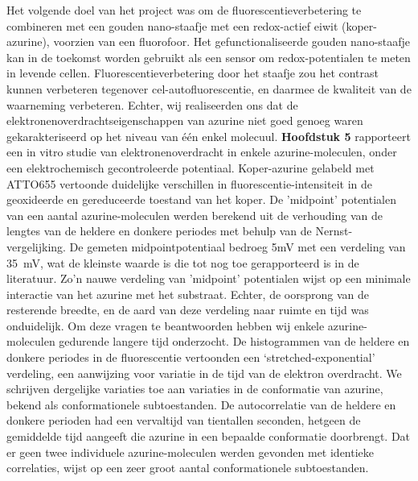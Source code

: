 Het volgende doel van het project was om de fluorescentieverbetering te combineren met een gouden nano-staafje met een redox-actief eiwit (koper-azurine), voorzien van een fluorofoor. Het gefunctionaliseerde gouden nano-staafje kan in de toekomst worden gebruikt als een sensor om redox-potentialen te meten in levende cellen. Fluorescentieverbetering door het staafje zou het contrast kunnen verbeteren tegenover cel-autofluorescentie, en daarmee de kwaliteit van de waarneming verbeteren. Echter, wij realiseerden ons dat de elektronenoverdrachtseigenschappen van azurine niet goed genoeg waren gekarakteriseerd op het niveau van één enkel molecuul. \textbf{Hoofdstuk 5} rapporteert een in vitro studie van elektronenoverdracht in enkele azurine-moleculen, onder een elektrochemisch gecontroleerde potentiaal. Koper-azurine gelabeld met ATTO655 vertoonde duidelijke verschillen in fluorescentie-intensiteit in de geoxideerde en gereduceerde toestand van het koper. De ’midpoint’ potentialen van een aantal azurine-moleculen werden berekend uit de verhouding van de lengtes van de heldere en donkere periodes met behulp van de Nernst-vergelijking. De gemeten midpointpotentiaal bedroeg 5mV met een verdeling  van \SI{35}{\mV}, wat de kleinste waarde is die tot nog toe  gerapporteerd is in de
literatuur. Zo'n nauwe verdeling van ’midpoint’ potentialen wijst op een minimale interactie van het azurine met het substraat. Echter, de oorsprong van de resterende breedte, en de aard van deze verdeling naar ruimte en tijd was onduidelijk. Om deze vragen te beantwoorden hebben wij enkele azurine-moleculen gedurende langere tijd onderzocht. De histogrammen van de heldere en donkere periodes in de fluorescentie vertoonden een ‘stretched-exponential’ verdeling, een aanwijzing voor variatie in de tijd van de elektron overdracht. We schrijven dergelijke variaties toe aan variaties in de conformatie  van azurine, bekend als conformationele subtoestanden. De autocorrelatie van de heldere en donkere perioden had een vervaltijd van tientallen seconden, hetgeen de gemiddelde tijd aangeeft die azurine in een bepaalde conformatie doorbrengt. Dat er geen twee individuele azurine-moleculen werden gevonden met identieke correlaties, wijst op  een zeer groot aantal conformationele subtoestanden.
